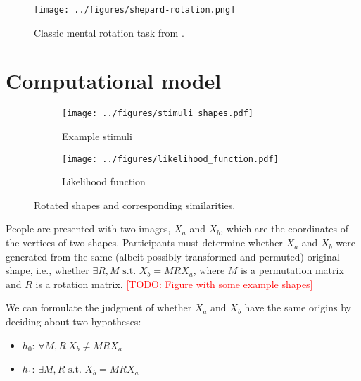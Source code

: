 \documentclass{article} %
\newcommand{\TODO}[1]{\textcolor{red}{[TODO: #1]}}
\begin{document}

\begin{figure}[t]
  \centering
  \texttt{[image: ../figures/shepard-rotation.png]}
  \caption{Classic mental rotation task from \cite{Shepard1971}.}
  \label{fig:mental-rotation}
\end{figure}

\section{Computational model}

\begin{figure}[t]
  \centering
  \begin{subfigure}[b]{0.45\textwidth}
    \centering
    \texttt{[image: ../figures/stimuli\_shapes.pdf]}
    \vspace{0pt}
    \caption{Example stimuli}
    \label{fig:stimuli}
  \end{subfigure}
  \begin{subfigure}[b]{0.45\textwidth}
    \centering
    \texttt{[image: ../figures/likelihood\_function.pdf]}
    \caption{Likelihood function}
    \label{fig:likelihood}
  \end{subfigure}
  \caption{Rotated shapes and corresponding similarities.}
\end{figure}

People are presented with two images, $X_a$ and $X_b$, which are the
coordinates of the vertices of two shapes. Participants must determine
whether $X_a$ and $X_b$ were generated from the same (albeit possibly
transformed and permuted) original shape, i.e., whether $\exists
R,M\textrm{ s.t. } X_b=MRX_a$, where $M$ is a permutation matrix and
$R$ is a rotation matrix. \TODO{Figure with some example shapes}

We can formulate the judgment of whether $X_a$ and $X_b$ have the same
origins by deciding about two hypotheses:

\begin{itemize}
\itemsep1pt\parskip0pt
\item
  $h_0$: $\forall M,R\ X_b\neq MRX_a$
\item
  $h_1$: $\exists M,R\textrm{ s.t. } X_b=MRX_a$
\end{itemize}
\end{document}

